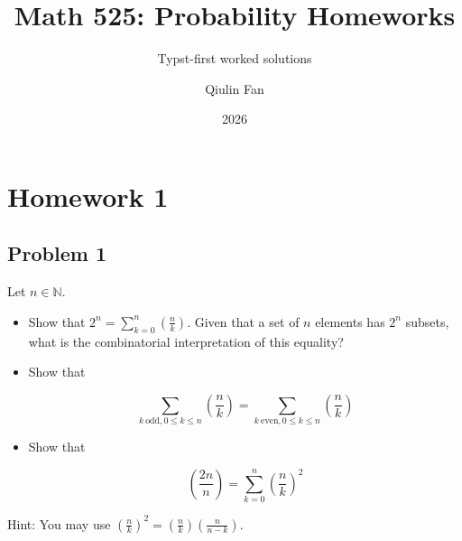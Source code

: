 \documentclass{qlnotes-export}
\title{Math 525: Probability Homeworks}
\subtitle{Typst-first worked solutions}
\author{Qiulin Fan}
\date{2026}
\begin{document}
\frontmatter
\maketitle
\tableofcontents

\mainmatter
\chapter{Homework 1}\label{homework-1}

\section{Problem 1}\label{problem-1-1}

Let \(n \in {\mathbb{N}}\).

\begin{itemize}
\item
  Show that \(2^{n} = \sum_{k = 0}^{n}\left( \frac{n}{k} \right)\). Given that a set of \(n\) elements has \(2^{n}\) subsets, what is the combinatorial interpretation of this equality?
\item
  Show that

  \[\sum\limits_{k\ \text{odd},0 \leq k \leq n}\left( \frac{n}{k} \right) = \sum\limits_{k\ \text{even},0 \leq k \leq n}\left( \frac{n}{k} \right)\]
\item
  Show that

  \[\left( \frac{2n}{n} \right) = \sum\limits_{k = 0}^{n}\left( \frac{n}{k} \right)^{2}\]
\end{itemize}

Hint: You may use \(\left( \frac{n}{k} \right)^{2} = \left( \frac{n}{k} \right)\left( \frac{n}{n - k} \right)\).
\end{document}
